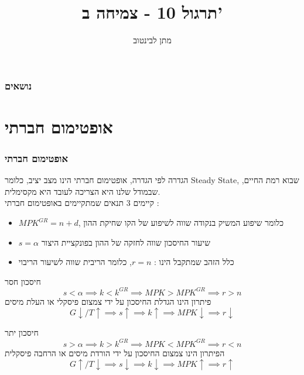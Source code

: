\documentclass[usenames,dvipsnames]{beamer}
\title{תרגול 10 - צמיחה ב'}
\author{\texthebrew{ מתן לבינטוב}}
\institute[{{ אב"ג}}]{{ אוניברסיטת בן גוריון בנגב}}
\date{}
\begin{document}
\begin{RTL}
\begin{frame}
\titlepage
\end{frame}
\begin{frame}
    \frametitle{נושאים}
    \tableofcontents
\end{frame}

\section{אופטימום חברתי}


\begin{frame}[allowframebreaks]
    \frametitle{אופטימום חברתי}
    \begin{block}{הגדרה}
        לפי הגדרה, אופטימום חברתי הינו מצב יציב, כלומר Steady State, שבוא רמת החיים, שבמודל שלנו היא הצריכה לעובד היא מקסימלית. \\
        קיימים 3 תנאים שמתקיימים באופטימום חברתי : 
        \begin{itemize}
            \item $MPK^{GR} = n + d  $, כלומר שיפוע המשיק בנקודה שווה לשיפוע של הקו שחיקת ההון
            \item $s = \alpha$ שיעור החיסכון שווה לחזקה של ההון בפונקציית היצור
            \item כלל הזהב שמתקבל הינו : $r = n$, כלומר הריבית שווה לשיעור הריבוי
        \end{itemize}  
    \end{block}

    \framebreak

    \begin{alertblock}{חיסכון חסר}
        $$s < \alpha \implies k < k^{GR} \implies MPK > MPK^{GR} \implies r > n$$
        פיתרון הינו הגדלת החיסכון על ידי צמצום פיסקלי או העלת מיסים 
        $$G \downarrow  / T \uparrow \implies s \uparrow \implies k \uparrow \implies MPK \downarrow \implies r \downarrow$$
    \end{alertblock}

    \begin{exampleblock}{חיסכון יתר}
        $$s > \alpha \implies k > k^{GR} \implies MPK < MPK^{GR} \implies r < n$$   
        הפיתרון הינו צמצום החיסכון על ידי הורדת מיסים או הרחבה פיסקלית
        $$G \uparrow  / T \downarrow \implies s \downarrow \implies k \downarrow \implies MPK \uparrow \implies r \uparrow$$
    \end{exampleblock}
    

\end{frame}


\end{RTL}
\end{document}

